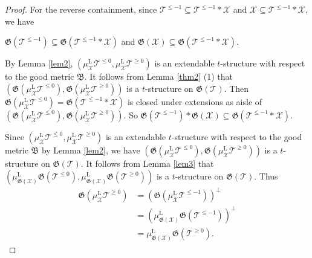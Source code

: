 \documentclass[11pt,a4paper]{amsart}
\numberwithin{equation}{section} \theoremstyle{plain}
\numberwithin{equation}{section} \theoremstyle{definition}
\begin{document}
\begin{proof}
For the reverse containment, since $\mathcal{T}^{\leq-1}\subseteq\mathcal{T}^{\leq-1}\ast\mathcal{X}$ and $\mathcal{X}\subseteq\mathcal{T}^{\leq-1}\ast\mathcal{X}$, we have
\begin{center}
$\mathfrak{G}(\mathcal{T}^{\leq-1})\subseteq\mathfrak{G}(\mathcal{T}^{\leq-1}\ast\mathcal{X})$ and $\mathfrak{G}(\mathcal{X})\subseteq\mathfrak{G}(\mathcal{T}^{\leq-1}\ast\mathcal{X})$.
\end{center}By Lemma \ref{lem2}, $(\mu^{\mathrm{L}}_{\mathcal{X}}\mathcal{T}^{\leq0},\mu^{\mathrm{L}}_{\mathcal{X}}\mathcal{T}^{\geq0})$ is an extendable $t$-structure with respect to the good metric $\mathfrak{B}$. It follows from Lemma \ref{thm2} (1) that $(\mathfrak{G}(\mu^{\mathrm{L}}_{\mathcal{X}}\mathcal{T}^{\leq0}),\mathfrak{G}(\mu^{\mathrm{L}}_{\mathcal{X}}\mathcal{T}^{\geq0}))$ is a $t$-structure on $\mathfrak{G}(\mathcal{T})$. Then $\mathfrak{G}(\mu^{\mathrm{L}}_{\mathcal{X}}\mathcal{T}^{\leq0})=\mathfrak{G}(\mathcal{T}^{\leq-1}\ast\mathcal{X})$ is closed under extensions as aisle of $(\mathfrak{G}(\mu^{\mathrm{L}}_{\mathcal{X}}\mathcal{T}^{\leq0}),\mathfrak{G}(\mu^{\mathrm{L}}_{\mathcal{X}}\mathcal{T}^{\geq0}))$. So $\mathfrak{G}(\mathcal{T}^{\leq-1})\ast\mathfrak{G}(\mathcal{X})\subseteq\mathfrak{G}(\mathcal{T}^{\leq-1}\ast\mathcal{X})$.

Since $(\mu^{\mathrm{L}}_{\mathcal{X}}\mathcal{T}^{\leq0},\mu^{\mathrm{L}}_{\mathcal{X}}\mathcal{T}^{\geq0})$ is an extendable $t$-structure with respect to the good metric $\mathfrak{B}$ by Lemma \ref{lem2}, we have $(\mathfrak{G}(\mu^{\mathrm{L}}_{\mathcal{X}}\mathcal{T}^{\leq0}),\mathfrak{G}(\mu^{\mathrm{L}}_{\mathcal{X}}\mathcal{T}^{\geq0}))$ is a $t$-structure on $\mathfrak{G}(\mathcal{T})$. It follows from Lemma \ref{lem3} that $(\mu^{\mathrm{L}}_{\mathfrak{G}(\mathcal{X})}\mathfrak{G}(\mathcal{T}^{\leq0}),\mu^{\mathrm{L}}_{\mathfrak{G}(\mathcal{X})}\mathfrak{G}(\mathcal{T}^{\geq0}))$ is a $t$-structure on $\mathfrak{G}(\mathcal{T})$. Thus \begin{align*}
\mathfrak{G}(\mu^{\mathrm{L}}_{\mathcal{X}}\mathcal{T}^{\geq0})
& = (\mathfrak{G}(\mu^{\mathrm{L}}_{\mathcal{X}}\mathcal{T}^{\leq-1}))^{\perp} \\
& = (\mu^{\mathrm{L}}_{\mathfrak{G}(\mathcal{X})}\mathfrak{G}(\mathcal{T}^{\leq-1}))^{\perp}\\
& = \mu^{\mathrm{L}}_{\mathfrak{G}(\mathcal{X})}\mathfrak{G}(\mathcal{T}^{\geq0}).
\end{align*}
\end{proof}
\end{document}

